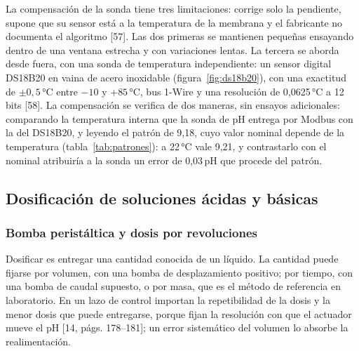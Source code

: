 La compensación de la sonda tiene tres limitaciones: corrige solo la pendiente, supone que su sensor está a la temperatura de la membrana y el fabricante no documenta el algoritmo [57]. Las dos primeras se mantienen pequeñas ensayando dentro de una ventana estrecha y con variaciones lentas. La tercera se aborda desde fuera, con una sonda de temperatura independiente: un sensor digital DS18B20 en vaina de acero inoxidable (figura~\ref{fig:ds18b20}), con una exactitud de $\pm0{,}5$\,°C entre $-10$ y $+85$\,°C, bus 1-Wire y una resolución de 0,0625\,°C a 12 bits [58]. La compensación se verifica de dos maneras, sin ensayos adicionales: comparando la temperatura interna que la sonda de pH entrega por Modbus con la del DS18B20, y leyendo el patrón de 9,18, cuyo valor nominal depende de la temperatura (tabla~\ref{tab:patrones}): a 22\,°C vale 9,21, y contrastarlo con el nominal atribuiría a la sonda un error de 0,03\,pH que procede del patrón.

\begin{figure}[!htb]\centering
{}
\end{figure}


\subsection{Dosificación de soluciones ácidas y básicas}\label{sec:dosificacion}

\subsubsection{Bomba peristáltica y dosis por revoluciones}\label{sec:bomba}
Dosificar es entregar una cantidad conocida de un líquido. La cantidad puede fijarse por volumen, con una bomba de desplazamiento positivo; por tiempo, con una bomba de caudal supuesto, o por masa, que es el método de referencia en laboratorio. En un lazo de control importan la repetibilidad de la dosis y la menor dosis que puede entregarse, porque fijan la resolución con que el actuador mueve el pH [14, págs. 178–181]; un error sistemático del volumen lo absorbe la realimentación.

